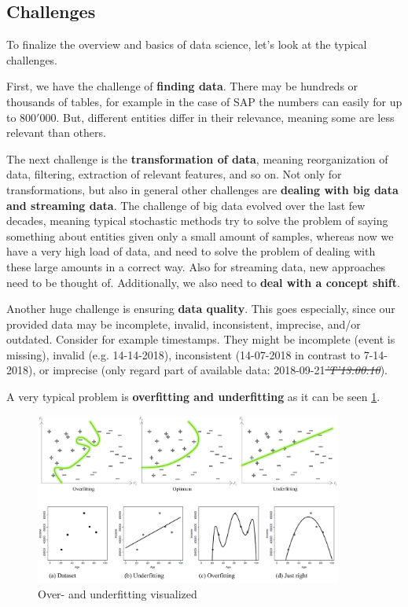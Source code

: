 \subsection{Challenges}
To finalize the overview and basics of data science, let's look at the typical challenges.

First, we have the challenge of \textbf{finding data}. There may be hundreds or thousands of tables, for example in the case of SAP the numbers can easily for up to $800'000$. But, different entities differ in their relevance, meaning some are less relevant than others.

The next challenge is the \textbf{transformation of data}, meaning reorganization of data, filtering, extraction of relevant features, and so on. Not only for transformations, but also in general other challenges are \textbf{dealing with big data and streaming data}. The challenge of big data evolved over the last few decades, meaning typical stochastic methods try to solve the problem of saying something about entities given only a small amount of samples, whereas now we have a very high load of data, and need to solve the problem of dealing with these large amounts in a correct way. Also for streaming data, new approaches need to be thought of. Additionally, we also need to \textbf{deal with a concept shift}.

Another huge challenge is ensuring \textbf{data quality}. This goes especially, since our provided data may be incomplete, invalid, inconsistent, imprecise, and/or outdated. Consider for example timestamps. They might be incomplete {\color{gray}\footnotesize(event is missing)}, invalid {\color{gray}\footnotesize(e.g. 14-14-2018)}, inconsistent {\color{gray}\footnotesize(14-07-2018 in contrast to 7-14-2018)}, or imprecise {\color{gray}\footnotesize(only regard part of available data: 2018-09-21\textit{\st{'T'13:00:10}})}.

A very typical problem is \textbf{overfitting and underfitting} as it can be seen \ref{fig:1_over_under_fitting}.

\begin{figure}[H]
  \centering
  \includegraphics[width=0.9\textwidth]{assets/basics/over_under_fitting.png}
  \caption{Over- and underfitting visualized}
  \label{fig:1_over_under_fitting}
\end{figure}

